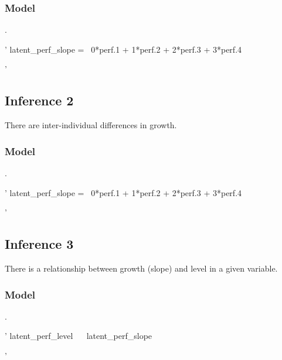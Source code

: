 \documentclass[english,,man]{apa6}
\newenvironment{Shaded}{\begin{snugshade}}{\end{snugshade}}
\newcommand{\StringTok}[1]{\textcolor[rgb]{0.31,0.60,0.02}{#1}}
\theoremstyle{definition}
\theoremstyle{definition}
\theoremstyle{definition}
\theoremstyle{remark}
\begin{document}
\hypertarget{model-2}{%
\subsubsection{Model}\label{model-2}}

.

\begin{Shaded}
\begin{Highlighting}[]
\StringTok{'}
\StringTok{latent_perf_slope =~ 0*perf.1 + 1*perf.2 + 2*perf.3 + 3*perf.4}

\StringTok{'}
\end{Highlighting}
\end{Shaded}

\hypertarget{inference-2-1}{%
\subsection{Inference 2}\label{inference-2-1}}

There are inter-individual differences in growth.

\hypertarget{model-3}{%
\subsubsection{Model}\label{model-3}}

.

\begin{Shaded}
\begin{Highlighting}[]
\StringTok{'}
\StringTok{latent_perf_slope =~ 0*perf.1 + 1*perf.2 + 2*perf.3 + 3*perf.4}

\StringTok{'}
\end{Highlighting}
\end{Shaded}

\hypertarget{inference-3}{%
\subsection{Inference 3}\label{inference-3}}

There is a relationship between growth (slope) and level in a given
variable.

\hypertarget{model-4}{%
\subsubsection{Model}\label{model-4}}

.

\begin{Shaded}
\begin{Highlighting}[]
\StringTok{'}
\StringTok{latent_perf_level ~~ latent_perf_slope}

\StringTok{'}
\end{Highlighting}
\end{Shaded}
\end{document}
